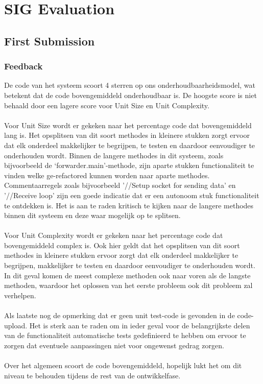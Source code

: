 \chapter{SIG Evaluation}
\pagebreak
\section{First Submission}
\subsection{Feedback}
De code van het systeem scoort 4 sterren op ons onderhoudbaarheidsmodel, wat betekent dat de code bovengemiddeld onderhoudbaar is. De hoogste score is niet behaald door een lagere score voor Unit Size en Unit Complexity.\\\\
Voor Unit Size wordt er gekeken naar het percentage code dat bovengemiddeld lang is. Het opsplitsen van dit soort methodes in kleinere stukken zorgt ervoor dat elk onderdeel makkelijker te begrijpen, te testen en daardoor eenvoudiger te onderhouden wordt. Binnen de langere methodes in dit systeem, zoals bijvoorbeeld de ‘forwarder.main’-methode, zijn aparte stukken functionaliteit te vinden welke ge-refactored kunnen worden naar aparte methodes. Commentaarregels zoals bijvoorbeeld '//Setup socket for sending data' en '//Receive loop' zijn een goede indicatie dat er een autonoom stuk functionaliteit te ontdekken is. Het is aan te raden kritisch te kijken naar de langere methodes binnen dit systeem en deze waar mogelijk op te splitsen.\\\\
Voor Unit Complexity wordt er gekeken naar het percentage code dat bovengemiddeld complex is. Ook hier geldt dat het opsplitsen van dit soort methodes in kleinere stukken ervoor zorgt dat elk onderdeel makkelijker te begrijpen, makkelijker te testen en daardoor eenvoudiger te onderhouden wordt. In dit geval komen de meest complexe methoden ook naar voren als de langste methoden, waardoor het oplossen van het eerste probleem ook dit probleem zal verhelpen.\\\\
Als laatste nog de opmerking dat er geen unit test-code is gevonden in de code-upload. Het is sterk aan te raden om in ieder geval voor de belangrijkste delen van de functionaliteit automatische tests gedefinieerd te hebben om ervoor te zorgen dat eventuele aanpassingen niet voor ongewenst gedrag zorgen.\\\\
Over het algemeen scoort de code bovengemiddeld, hopelijk lukt het om dit niveau te behouden tijdens de rest van de ontwikkelfase.

